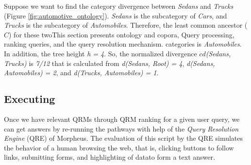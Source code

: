 Suppose we want to find the category divergence between \textit{Sedans}
and \textit{Trucks} (Figure \ref{fig:automotive_ontology}). 
\textit{Sedans} is the subcategory of \textit{Cars}, and \textit{Trucks}
is the subcategory of \textit{Automobiles}. Therefore, the least common ancestor ($C$)
for these twoThis section presents ontology and copora, Query processing, ranking queries, and the query resolution mechanism. categories is \textit{Automobiles}. In addition, the tree height \textit{h = 4}.
So, the normalized divergence $cd$\textit{(Sedans, Trucks)} is \textit{7/12}
that is calculated from \textit{d(Sedans, Root) = 4}, \textit{d(Sedans, Automobiles) = 2}, and \textit{d(Trucks, Automobiles) = 1}.


\subsection{Executing} 

Once we have relevant QRMs through QRM ranking for a given user query, we can get answers by re-running the pathways with help of the \emph{Query Resolution Engine} (QRE) of Morpheus. The evaluation of this script by the QRE simulates the behavior of a human browsing the web, that is, clicking buttons to follow links, submitting forms, and highlighting of datato form a text answer.


